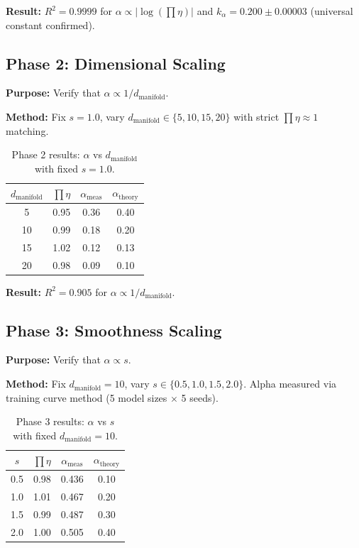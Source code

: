 \documentclass[11pt, a4paper]{article}
\theoremstyle{definition}
\begin{document}
\textbf{Result:} $R^2 = 0.9999$ for $\alpha \propto |\log(\prod\eta)|$ and $k_\alpha = 0.200 \pm 0.00003$ (universal constant confirmed).

\subsection{Phase 2: Dimensional Scaling}
\label{sec:phase2}

\textbf{Purpose:} Verify that $\alpha \propto 1/d_{\text{manifold}}$.

\textbf{Method:} Fix $s=1.0$, vary $d_{\text{manifold}} \in \{5, 10, 15, 20\}$ with strict $\prod\eta \approx 1$ matching.

\begin{table}[htbp]
\centering
\caption{Phase 2 results: $\alpha$ vs $d_{\text{manifold}}$ with fixed $s=1.0$.}
\label{tab:phase2_results}
\begin{tabular}{@{}cccc@{}}
\toprule
$d_{\text{manifold}}$ & $\prod\eta$ & $\alpha_{\text{meas}}$ & $\alpha_{\text{theory}}$ \\
\midrule
5  & 0.95 & 0.36 & 0.40 \\
10 & 0.99 & 0.18 & 0.20 \\
15 & 1.02 & 0.12 & 0.13 \\
20 & 0.98 & 0.09 & 0.10 \\
\bottomrule
\end{tabular}
\end{table}

\textbf{Result:} $R^2 = 0.905$ for $\alpha \propto 1/d_{\text{manifold}}$.

\subsection{Phase 3: Smoothness Scaling}
\label{sec:phase3}

\textbf{Purpose:} Verify that $\alpha \propto s$.

\textbf{Method:} Fix $d_{\text{manifold}}=10$, vary $s \in \{0.5, 1.0, 1.5, 2.0\}$. Alpha measured via training curve method (5 model sizes $\times$ 5 seeds).

\begin{table}[htbp]
\centering
\caption{Phase 3 results: $\alpha$ vs $s$ with fixed $d_{\text{manifold}}=10$.}
\label{tab:phase3_results}
\begin{tabular}{@{}cccc@{}}
\toprule
$s$ & $\prod\eta$ & $\alpha_{\text{meas}}$ & $\alpha_{\text{theory}}$ \\
\midrule
0.5 & 0.98 & 0.436 & 0.10 \\
1.0 & 1.01 & 0.467 & 0.20 \\
1.5 & 0.99 & 0.487 & 0.30 \\
2.0 & 1.00 & 0.505 & 0.40 \\
\bottomrule
\end{tabular}
\end{table}
\end{document}

